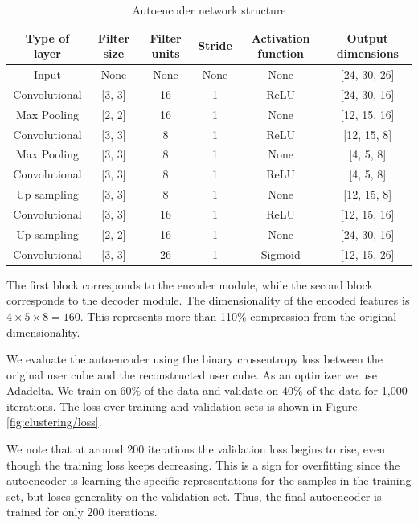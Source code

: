 \documentclass{article}
\begin{document}
\begin{table}[H]
\centering
\begin{tabular}{||c|c|c|c|c|c||}
\hline
\textbf{Type of layer} & \textbf{Filter size} & \textbf{Filter units} & \textbf{Stride} & \textbf{Activation function} & \textbf{Output dimensions} \\
[0.5ex] 
\hline \hline
Input & None & None & None & None  & [24, 30, 26]\\
Convolutional & [3, 3] & 16 & 1 & ReLU  & [24, 30, 16]\\
Max Pooling & [2, 2] & 16 & 1 & None  & [12, 15, 16]\\
Convolutional & [3, 3] & 8 & 1 & ReLU  & [12, 15, 8]\\
Max Pooling & [3, 3] & 8 & 1 & None  & [4, 5, 8]\\
\hline
Convolutional & [3, 3] & 8 & 1 & ReLU  & [4, 5, 8]\\
Up sampling & [3, 3] & 8 & 1 & None  & [12, 15, 8]\\
Convolutional & [3, 3] & 16 & 1 & ReLU  & [12, 15, 16]\\
Up sampling & [2, 2] & 16 & 1 & None  & [24, 30, 16]\\
Convolutional & [3, 3] & 26 & 1 & Sigmoid  & [12, 15, 26]\\ [1ex]
\hline 
\end{tabular}
\caption{Autoencoder network structure}
\label{table:autoencoderStructure}
\end{table}

The first block corresponds to the encoder module, while the second block corresponds to the decoder module. The dimensionality of the encoded features is $4 \times 5 \times 8 = 160$. This represents more than 110\% compression from the original dimensionality. 

We evaluate the autoencoder using the binary crossentropy loss between the original user cube and the reconstructed user cube. As an optimizer we use Adadelta. We train on 60\% of the data and validate on 40\% of the data for 1,000 iterations. The loss over training and validation sets is shown in Figure \ref{fig:clustering/loss}.

We note that at around 200 iterations the validation loss begins to rise, even though the training loss keeps decreasing. This is a sign for overfitting since the autoencoder is learning the specific representations for the samples in the training set, but loses generality on the validation set. Thus, the final autoencoder is trained for only 200 iterations.
\end{document}
